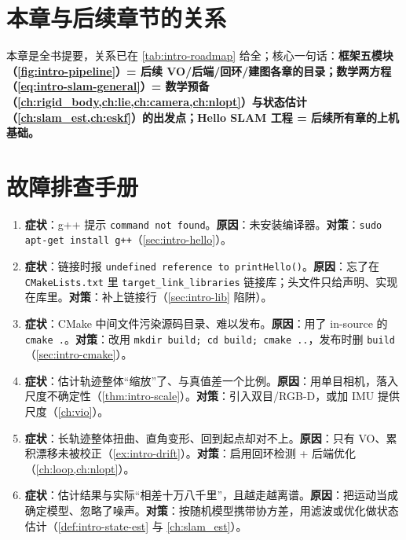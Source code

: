 \section*{本章与后续章节的关系}
本章是全书提要，关系已在 \cref{tab:intro-roadmap} 给全；核心一句话：\textbf{框架五模块（\cref{fig:intro-pipeline}）= 后续 VO/后端/回环/建图各章的目录；数学两方程（\cref{eq:intro-slam-general}）= 数学预备（\cref{ch:rigid_body,ch:lie,ch:camera,ch:nlopt}）与状态估计（\cref{ch:slam_est,ch:eskf}）的出发点；Hello SLAM 工程 = 后续所有章的上机基础。}

\section*{故障排查手册}
\begin{enumerate}
  \item \textbf{症状}：g++ 提示 \texttt{command not found}。\textbf{原因}：未安装编译器。\textbf{对策}：\texttt{sudo apt-get install g++}（\cref{sec:intro-hello}）。
  \item \textbf{症状}：链接时报 \texttt{undefined reference to printHello()}。\textbf{原因}：忘了在 \texttt{CMakeLists.\allowbreak txt} 里 \texttt{target\_link\_libraries} 链接库；头文件只给声明、实现在库里。\textbf{对策}：补上链接行（\cref{sec:intro-lib} 陷阱）。
  \item \textbf{症状}：CMake 中间文件污染源码目录、难以发布。\textbf{原因}：用了 in-source 的 \texttt{cmake .}。\textbf{对策}：改用 \texttt{mkdir build; cd build; cmake ..}，发布时删 \texttt{build}（\cref{sec:intro-cmake}）。
  \item \textbf{症状}：估计轨迹整体“缩放”了、与真值差一个比例。\textbf{原因}：用单目相机，落入尺度不确定性（\cref{thm:intro-scale}）。\textbf{对策}：引入双目/RGB-D，或加 IMU 提供尺度（\cref{ch:vio}）。
  \item \textbf{症状}：长轨迹整体扭曲、直角变形、回到起点却对不上。\textbf{原因}：只有 VO、累积漂移未被校正（\cref{ex:intro-drift}）。\textbf{对策}：启用回环检测 + 后端优化（\cref{ch:loop,ch:nlopt}）。
  \item \textbf{症状}：估计结果与实际“相差十万八千里”，且越走越离谱。\textbf{原因}：把运动当成确定模型、忽略了噪声。\textbf{对策}：按随机模型携带协方差，用滤波或优化做状态估计（\cref{def:intro-state-est} 与 \cref{ch:slam_est}）。
\end{enumerate}
